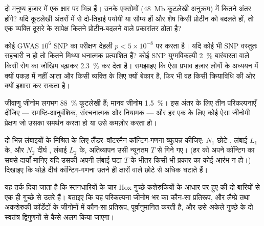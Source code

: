 \begin{exercise}[$\star\star$]\label{exo:b3:genomics:8}
दो मनुष्य हज़ार में एक क्षार पर भिन्न हैं। उनके एक्सोमों
(\qty{48}{Mb} कूटलेखी अनुक्रम) में कितने अंतर होंगे? यदि कूटलेखी अंतरों
में से दो-तिहाई पर्यायी या सौम्य हों और शेष किसी प्रोटीन को बदलते हों,
तो एक व्यक्ति दूसरे के सापेक्ष कितने प्रोटीन-बदलने वाले प्रकारांतर ढोता है?
\end{exercise}

\begin{exercise}[$\star\star$]\label{exo:b3:genomics:9}
कोई GWAS $10^{6}$ SNP का परीक्षण देहली $p < 5\times 10^{-8}$ पर करता
है। यदि कोई भी SNP वस्तुतः सहचारी न हो तो कितने मिथ्या धनात्मक
प्रत्याशित हैं? कोई SNP युग्मविकल्पी \qty{2}{\%} बारंबारता वाले किसी
रोग का जोखिम बढ़ाकर \qty{2.3}{\%} कर देता है। समझाइए कि ऐसा प्रभाव
हज़ार लोगों के अध्ययन में क्यों पकड़ में नहीं आता और किसी व्यक्ति के लिए
क्यों बेकार है, फिर भी वह किसी क्रियाविधि की ओर क्यों इशारा कर सकता है।
\end{exercise}

\begin{exercise}[$\star\star\star$]\label{exo:b3:genomics:10}
जीवाणु जीनोम लगभग \qty{88}{\%} कूटलेखी हैं; मानव जीनोम \qty{1.5}{\%}।
इस अंतर के लिए तीन परिकल्पनाएँ दीजिए --- समष्टि-आनुवंशिक, संरचनात्मक
और नियामक --- और हर एक के लिए कोई ऐसा जीनोमी प्रेक्षण जो उसका समर्थन
करता हो या उसे कमज़ोर करता हो।
\end{exercise}

\begin{exercise}[$\star\star\star$]\label{exo:b3:genomics:11}
दो भिन्न लंबाइयों के मिश्रित  के लिए लैंडर--वॉटरमैन कॉन्टिग-गणना
व्युत्पन्न कीजिए: $N_{1}$ छोटे , लंबाई $L_{1}$ के, और $N_{2}$
दीर्घ , लंबाई $L_{2}$ के, अतिव्यापन उसी न्यूनतम $T$ से गिने गए।
(हर  को अपने कॉन्टिग का सबसे दायाँ मानिए यदि उसकी अपनी लंबाई घटा
$T$ के भीतर किसी भी प्रकार का कोई  आरंभ न हो।) दिखाइए कि थोड़े
दीर्घ  कॉन्टिग-गणना उतने ही क्षारों वाले छोटे  से अधिक घटाते हैं।
\end{exercise}

\begin{exercise}[$\star\star\star$]\label{exo:b3:genomics:12}
यह तर्क दिया जाता है कि स्तनधारियों के चार Hox गुच्छे कशेरुकियों के आधार
पर हुए  की दो बारियों से एक ही गुच्छे से उतरे हैं।
बताइए कि यह परिकल्पना जीनोम भर  का कौन-सा प्रतिरूप, और
लैम्प्रे तथा अकशेरुकी कॉर्डेटों के जीनोमों में कौन-सा प्रतिरूप,
पूर्वानुमानित करती है, और उसे अकेले गुच्छे के दो स्वतंत्र द्विगुणनों से
कैसे अलग किया जाएगा।
\end{exercise}

